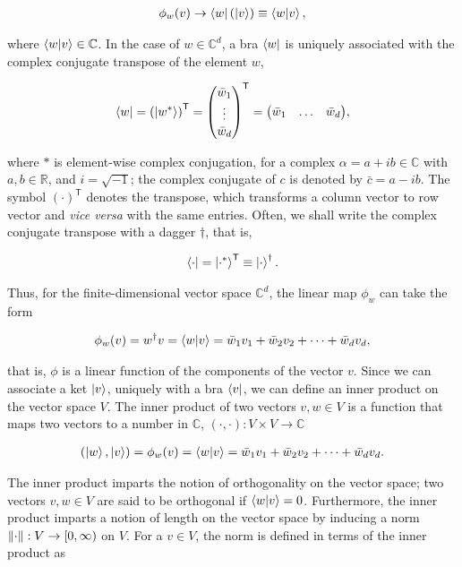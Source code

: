 \begin{align}
	\phi_w(v) \to \bra{w}(\ket{v}) \equiv \braket{w}{v},
\end{align}
 
\noindent
where $\braket{w}{v} \in \mathbb{C}$. In the case of $w \in \mathbb{C}^{d}$, a bra $\bra{w}$ is uniquely associated with the complex conjugate transpose of the element $w$,

\begin{align}
    \bra{w} = \left(\ket{w^{*}}\right)^\mathsf{T} = \mqty(\bar{w}_1 \\ \vdots \\
    \bar{w}_d)^\mathsf{T} = \mqty(\bar{w}_1 & \ldots & \bar{w}_d),
\end{align}

\noindent
where $*$ is element-wise complex conjugation, \ie for a complex $\alpha = a + i b \in \mathbb{C}$ with $a,b \in \mathbb{R}$, and $i = \sqrt{-1}$; the complex conjugate of $c$ is denoted by $\bar{c} = a - i b$. The symbol $(\cdot)^{\mathsf{T}}$ denotes the transpose, which transforms a column vector to row vector and \emph{vice versa} with the same entries. Often, we shall write the complex conjugate transpose with a dagger $\dagger$, that is,

\begin{align}
    \bra{\cdot} = \ket{\cdot^{*}}^\mathsf{T} \equiv \ket{\cdot}^{\dagger}.
\end{align}

\noindent
Thus, for the finite-dimensional vector space $\mathbb{C}^{d}$, the linear map $\phi_w$ can take the form

\begin{align}
	\phi_w(v) = w^{\dagger}v = \braket{w}{v}= \bar{w}_1v_1 + \bar{w}_2v_2 + \cdots + \bar{w}_dv_d,
\end{align}

\noindent
that is, $\phi$ is a linear function of the components of the vector $v$. Since we can associate a ket $\ket{v}$, uniquely with a bra $\bra{v}$, we can define an inner product on the vector space $V$. The inner product of two vectors $v,w \in V$ is a function that maps two vectors to a number in $\mathbb{C}$, $(\cdot,\cdot): V \times V \to \mathbb{C}$

\begin{align}
    (\ket{w}, \ket{v}) = \phi_w(v)  = \braket{w}{v} = \bar{w}_1v_1 + \bar{w}_2v_2 + \cdots + \bar{w}_dv_d.
\end{align}

\noindent
The inner product imparts the notion of orthogonality on the vector space; two vectors $v,w \in V$ are said to be orthogonal if $\braket{w}{v} = 0$. Furthermore, the inner product imparts a notion of length on the vector space by inducing a norm $\norm{\cdot}: V \to [0, \infty)$ on $V$. For a $v \in V$, the norm is defined in terms of the inner product as 

